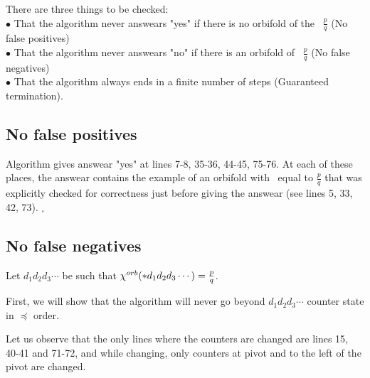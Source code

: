 There are three things to be checked: \\
$\bullet$ That the algorithm never answears "yes" if there is no orbifold of the \Eoc\ 
$\frac{p}{q}$ (No false positives)\\
$\bullet$ That the algorithm never answears "no" if there is an orbifold of \Eoc\ 
$\frac{p}{q}$ (No false negatives)\\ 
$\bullet$ That the algorithm always ends in a finite number of steps (Guaranteed termination). 








\subsection{No false positives}
Algorithm gives answear "yes" at lines 7-8, 35-36, 44-45, 75-76. At each of these places, 
the answear contains the example of an orbifold with \Eoc\ equal to $\frac{p}{q}$ that was 
explicitly checked for correctness just before giving the answear (see lines 5, 33, 42, 73). 
$_\square$    
\subsection{No false negatives}
Let $d_1d_2d_3\cdots$ be such that ${\chi^{orb}(*d_1d_2d_3\cdots)} = \frac{p}{q}$. 

%

First, we will show that the algorithm will never 
go beyond $d_1d_2d_3\cdots$ counter state in $\preceq$ order. 

Let us observe that the only lines where 
the counters are changed are lines 15, 40-41 and 71-72, and while changing, 
only counters 
at pivot and to the left of the pivot are changed. 

